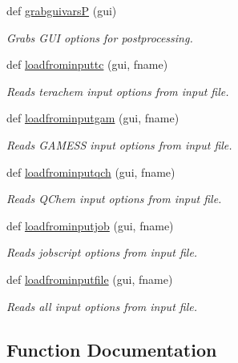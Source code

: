 \begin{DoxyCompactItemize}
def \hyperlink{namespacemolSimplify_1_1Scripts_1_1grabguivars_a9f2bf5a0afde2a4349f80be46b34df6e}{grabguivarsP} (gui)
\begin{DoxyCompactList}\small\item\em Grabs G\+UI options for postprocessing. \end{DoxyCompactList}\item 
def \hyperlink{namespacemolSimplify_1_1Scripts_1_1grabguivars_ac221cb0e04bd09dabecf9b5176a9ca06}{loadfrominputtc} (gui, fname)
\begin{DoxyCompactList}\small\item\em Reads terachem input options from input file. \end{DoxyCompactList}\item 
def \hyperlink{namespacemolSimplify_1_1Scripts_1_1grabguivars_ab22fbc8d867b9fb23211808f5a874636}{loadfrominputgam} (gui, fname)
\begin{DoxyCompactList}\small\item\em Reads G\+A\+M\+E\+SS input options from input file. \end{DoxyCompactList}\item 
def \hyperlink{namespacemolSimplify_1_1Scripts_1_1grabguivars_a6b1557164e134acf87291e06e71e8a11}{loadfrominputqch} (gui, fname)
\begin{DoxyCompactList}\small\item\em Reads Q\+Chem input options from input file. \end{DoxyCompactList}\item 
def \hyperlink{namespacemolSimplify_1_1Scripts_1_1grabguivars_a447887b9c0ca14394218c26db86889b1}{loadfrominputjob} (gui, fname)
\begin{DoxyCompactList}\small\item\em Reads jobscript options from input file. \end{DoxyCompactList}\item 
def \hyperlink{namespacemolSimplify_1_1Scripts_1_1grabguivars_a8a268814aff1d53aa3c2ba617c3229f7}{loadfrominputfile} (gui, fname)
\begin{DoxyCompactList}\small\item\em Reads all input options from input file. \end{DoxyCompactList}\end{DoxyCompactItemize}


\subsection{Function Documentation}
\mbox{\label{namespacemolSimplify_1_1Scripts_1_1grabguivars_ada1b06231e634df1c41e807d8d1c9a94}} 
